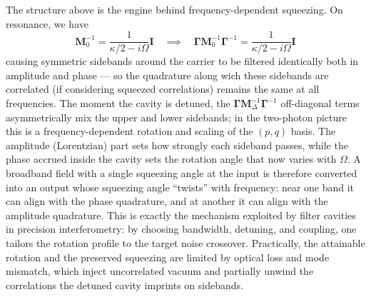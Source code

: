 The structure above is the engine behind frequency-dependent squeezing. On resonance, we have 
\begin{equation}
\mathbf{M}_0^{-1} = \frac{1}{\kappa/2 - i\Omega} \mathbf{I} \quad \implies \quad  \mathbf{\Gamma} \mathbf{M}_0^{-1} \mathbf{\Gamma}^{-1} = \frac{1}{\kappa/2 - i\Omega} \mathbf{I}
\end{equation}
causing symmetric sidebands around the carrier to be filtered identically both in amplitude and phase — so the quadrature along wich these sidebands are correlated (if considering squeezed correlations) remains the same at all frequencies. The moment the cavity is detuned, the $\mathbf{\Gamma}\mathbf{M}^{-1}_\Delta \mathbf{\Gamma}^{-1}$ off-diagonal terms asymmetrically mix the upper and lower sidebands; in the two-photon picture this is a frequency-dependent rotation and scaling of the $(p,q)$ basis. The amplitude (Lorentzian) part sets how strongly each sideband passes, while the phase accrued inside the cavity sets the rotation angle that now varies with $\Omega$. A broadband field with a single squeezing angle at the input is therefore converted into an output whose squeezing angle “twists” with frequency: near one band it can align with the phase quadrature, and at another it can align with the amplitude quadrature. This is exactly the mechanism exploited by filter cavities in precision interferometry: by choosing bandwidth, detuning, and coupling, one tailors the rotation profile to the target noise crossover. Practically, the attainable rotation and the preserved squeezing are limited by optical loss and mode mismatch, which inject uncorrelated vacuum and partially unwind the correlations the detuned cavity imprints on sidebands. \\


